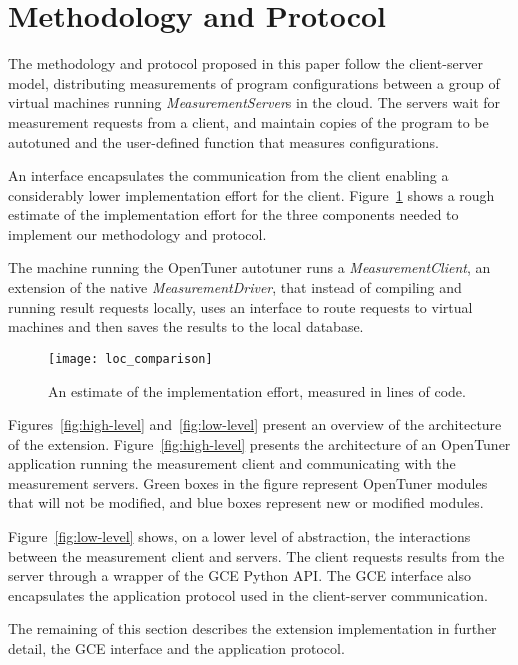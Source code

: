 \section{Methodology and Protocol}
\label{sec:ext}

The methodology and protocol proposed in this paper follow the client-server
model, distributing measurements of program configurations between a group of
virtual machines running \emph{MeasurementServer}s in the cloud. The servers
wait for measurement requests from a client, and maintain copies of the
program to be autotuned and the user-defined function that measures
configurations.

An interface encapsulates the communication
from the client enabling a considerably lower implementation
effort for the client. Figure~\ref{fig:loc-comp} shows a rough
estimate of the implementation effort for the three components
needed to implement our methodology and protocol.

The machine running the OpenTuner autotuner runs a \emph{MeasurementClient},
an extension of the native \emph{MeasurementDriver}, that instead of
compiling and running result requests locally, uses an interface to
route requests to virtual machines and then saves the results to the local
database. 

\begin{figure}[htpb]
    \centering
    \texttt{[image: loc\_comparison]}
    \caption{An estimate of the implementation effort, measured in lines of code.}
    \label{fig:loc-comp}
\end{figure}

Figures~\ref{fig:high-level} and~\ref{fig:low-level} present an
overview of the architecture of the extension.
Figure~\ref{fig:high-level} presents the architecture of an OpenTuner
application running the measurement client and communicating with the
measurement servers.  Green boxes in the figure represent OpenTuner modules
that will not be modified, and blue boxes represent new or modified modules.

Figure~\ref{fig:low-level} shows, on a lower level of abstraction, the
interactions between the measurement client and servers. The client
requests results from the server through a wrapper of the GCE Python API.
The GCE interface also encapsulates the application protocol used in
the client-server communication.

The remaining of this section describes the extension implementation in further
detail, the GCE interface and the application protocol.

